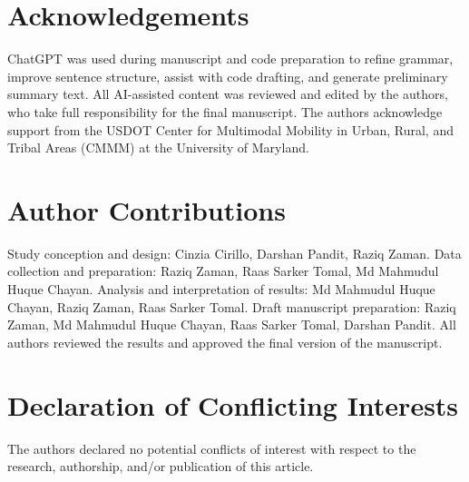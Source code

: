 \documentclass[3p,times,procedia]{elsarticle}
\begin{document}
\section*{Acknowledgements}
ChatGPT was used during manuscript and code preparation to refine grammar, improve sentence structure, assist with code drafting, and generate preliminary summary text. All AI-assisted content was reviewed and edited by the authors, who take full responsibility for the final manuscript. The authors acknowledge support from the USDOT Center for Multimodal Mobility in Urban, Rural, and Tribal Areas (CMMM) at the University of Maryland.

\section*{Author Contributions}
Study conception and design: Cinzia Cirillo, Darshan Pandit, Raziq Zaman. Data collection and preparation: Raziq Zaman, Raas Sarker Tomal, Md Mahmudul Huque Chayan. Analysis and interpretation of results: Md Mahmudul Huque Chayan, Raziq Zaman, Raas Sarker Tomal. Draft manuscript preparation: Raziq Zaman, Md Mahmudul Huque Chayan, Raas Sarker Tomal, Darshan Pandit. All authors reviewed the results and approved the final version of the manuscript.

\section*{Declaration of Conflicting Interests}
The authors declared no potential conflicts of interest with respect to the research, authorship, and/or publication of this article.



\end{document}
